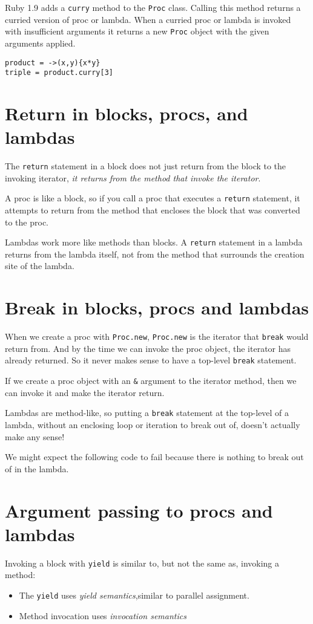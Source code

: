 \documentclass[11pt, a4paper]{book}
\begin{document}
Ruby 1.9 adds a \verb|curry| method to the \verb|Proc| class. Calling this
method returns a curried version of proc or lambda. When a curried proc or
lambda is invoked with insufficient arguments it returns a new \verb|Proc|
object with the given arguments applied.
\begin{verbatim}
product = ->(x,y){x*y}
triple = product.curry[3]
\end{verbatim}

\section{Return in blocks, procs, and lambdas}
The \verb|return| statement in a block does not just return from the block to
the invoking iterator, \emph{it returns from the method that invoke the
iterator}.

A proc is like a block, so if you call a proc that executes a \verb|return|
statement, it attempts to return from the method that encloses the block that
was converted to the proc.

Lambdas work more like methods than blocks. A \verb|return| statement in a
lambda returns from the lambda itself, not from the method that surrounds the
creation site of the lambda.

\section{Break in blocks, procs and lambdas}
When we create a proc with \verb|Proc.new|, \verb|Proc.new| is the iterator that
\verb|break| would return from. And by the time we can invoke the proc object,
the iterator has already returned. So it never makes sense to have a top-level
\verb|break| statement.

If we create a proc object with an \verb|&| argument to the iterator method,
then we can invoke it and make the iterator return.

Lambdas are method-like, so putting a \verb|break| statement at the top-level of
a lambda, without an enclosing loop or iteration to break out of, doesn't
actually make any sense!

We might expect the following code to fail because there is nothing to break out
of in the lambda.
\section{Argument passing to procs and lambdas}
Invoking a block with \verb|yield| is similar to, but not the same as, invoking
a method:
\begin{itemize}
\item The \verb|yield| uses \emph{yield semantics},similar to parallel
assignment.
\item Method invocation uses \emph{invocation semantics}
\end{itemize}
\end{document}
